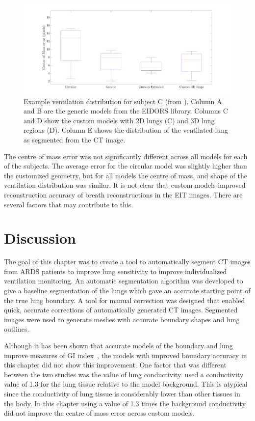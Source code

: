 \begin{figure}
	\centering
	\includegraphics[width=\textwidth]{chapter5-CT_to_mesh/imgs/error_boxplot.pdf}
	\caption[Example ventilation distributions]{\label{fig:c-of-m-error}%
	Example ventilation distribution for subject C (from ).
	Column A and B are the generic models from the EIDORS library. 
	Columns C and D show the custom models with 2D lungs (C) and 3D lung regions (D).
	Column E shows the distribution of the ventilated lung as segmented from the CT image. 
	}
\end{figure}

The centre of mass error was not significantly different across all models for each of the subjects. 
The average error for the circular model was slightly higher than the customized geometry, but for 
all models the centre of mass, and shape of the ventilation distribution was similar. It is not clear 
that custom models improved reconstruction accuracy of breath reconstructions in the EIT images. 
There are several factors that may contribute to this. 

\section{Discussion}
The goal of this chapter was to create a tool to automatically segment CT images from ARDS patients 
to improve lung sensitivity to improve individualized ventilation monitoring. 
An automatic segmentation algorithm was developed to give a baseline segmentation of the lungs which 
gave an accurate starting point of the true lung boundary. A tool for manual correction was designed 
that enabled quick, accurate corrections of automatically generated CT images. 
Segmented images were used to generate meshes with accurate boundary  shapes and lung outlines. 

Although it has been shown that accurate models of the boundary and lung improve measures of
GI index~\parencite{yang_lung_2021}, the models with improved boundary accuracy in this chapter 
did not show this improvement. One factor that was different between the two studies was the value 
of lung conductivity.  used a conductivity value of 1.3 for the lung 
tissue relative to the model background. This is atypical since the conductivity of lung tissue is 
considerably lower than other tissues in the body. In this chapter using a value of 
1.3 times the background 
conductivity did not improve the centre of mass error across custom models.

